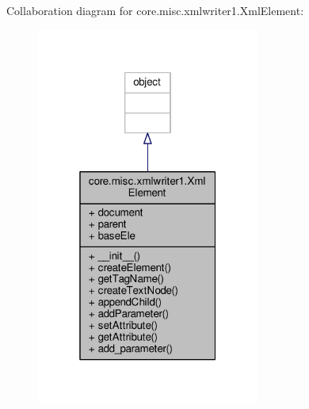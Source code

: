 Collaboration diagram for core.\+misc.\+xmlwriter1.\+Xml\+Element\+:
\nopagebreak
\begin{figure}[H]
\begin{center}
\leavevmode
\includegraphics[width=208pt]{classcore_1_1misc_1_1xmlwriter1_1_1_xml_element__coll__graph}
\end{center}
\end{figure}

